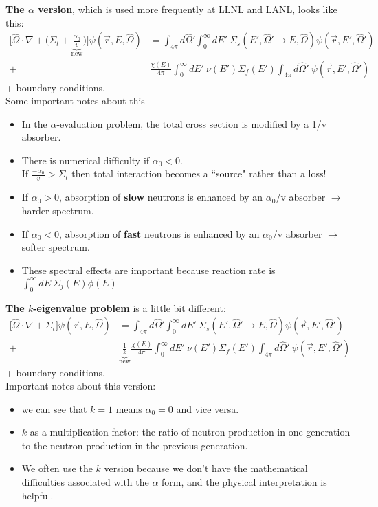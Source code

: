 \documentclass[12pt]{article}
\newcommand{\vOmega}{\ensuremath{\hat{\Omega}}}
\begin{document}
\textbf{The $\alpha$ version}, which is used more frequently at LLNL and LANL, looks like this:
%
\begin{align*}
\bigl[\vOmega \cdot \nabla + \bigl(\Sigma_t + \underbrace{\frac{\alpha_0}{v}}_{\text{new}}\bigr)\bigr]\psi(\vec{r}, E, \vOmega) &= \int_{4 \pi} d\vOmega' \int_0^{\infty} dE' \: \Sigma_s(E', \vOmega' \rightarrow E, \vOmega) \psi(\vec{r}, E', \vOmega')\\
 +& \frac{\chi(E)}{4 \pi}\int_0^{\infty} dE' \: \nu(E') \Sigma_f(E') \int_{4 \pi} d\vOmega' \:\psi(\vec{r}, E', \vOmega')
\end{align*}
+ boundary conditions.\\
%
Some important notes about this
\begin{itemize}
\item In the $\alpha$-evaluation problem, the total cross section is modified by a 1/v absorber.
\item There is numerical difficulty if $\alpha_0 < 0$.\\
If $\frac{-\alpha_0}{v} > \Sigma_t$ then total interaction becomes a ``source" rather than a loss!
\item If $\alpha_0 > 0$, absorption of \textbf{slow} neutrons is enhanced by an $\alpha_0$/v absorber $\rightarrow$ harder spectrum.
\item If $\alpha_0 < 0$, absorption of \textbf{fast} neutrons is enhanced by an $\alpha_0$/v absorber $\rightarrow$ softer spectrum.
\item These spectral effects are important because reaction rate is $\int_0^{\infty} dE \:\Sigma_j(E) \phi(E)$
\end{itemize}

\textbf{The $k$-eigenvalue problem} is a little bit different:
%
\begin{align*}
\bigl[\vOmega \cdot \nabla + \Sigma_t \bigr]\psi(\vec{r}, E, \vOmega) &= \int_{4 \pi} d\vOmega' \int_0^{\infty} dE' \: \Sigma_s(E', \vOmega' \rightarrow E, \vOmega) \psi(\vec{r}, E', \vOmega')\\
 +& \underbrace{\frac{1}{k}}_{\text{new}}\frac{\chi(E)}{4 \pi}\int_0^{\infty} dE' \: \nu(E') \Sigma_f(E') \int_{4 \pi} d\vOmega' \:\psi(\vec{r}, E', \vOmega')
\end{align*}
\vspace*{-.5em}
+  boundary conditions.\\
%
Important notes about this version:
\begin{itemize}
\item we can see that $k=1$ means $\alpha_0 = 0$ and vice versa.
\item $k$ as a multiplication factor: the ratio of neutron production in one generation to the neutron production in the previous generation.
\item We often use the $k$ version because we don't have the mathematical difficulties associated with the $\alpha$ form, and the physical interpretation is helpful.
\end{itemize}
\end{document}
